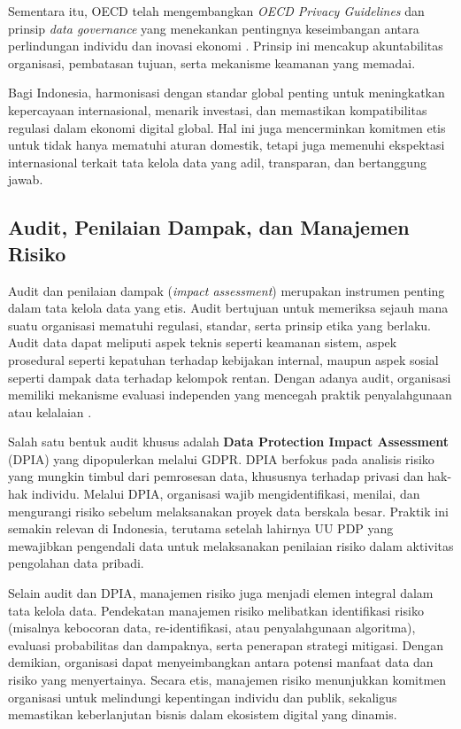 Sementara itu, OECD telah mengembangkan \textit{OECD Privacy Guidelines} dan prinsip \textit{data governance} yang menekankan pentingnya keseimbangan antara perlindungan individu dan inovasi ekonomi \cite{oecd2015}. Prinsip ini mencakup akuntabilitas organisasi, pembatasan tujuan, serta mekanisme keamanan yang memadai.  

Bagi Indonesia, harmonisasi dengan standar global penting untuk meningkatkan kepercayaan internasional, menarik investasi, dan memastikan kompatibilitas regulasi dalam ekonomi digital global. Hal ini juga mencerminkan komitmen etis untuk tidak hanya mematuhi aturan domestik, tetapi juga memenuhi ekspektasi internasional terkait tata kelola data yang adil, transparan, dan bertanggung jawab.

\subsection{Audit, Penilaian Dampak, dan Manajemen Risiko}

Audit dan penilaian dampak (\textit{impact assessment}) merupakan instrumen penting dalam tata kelola data yang etis. Audit bertujuan untuk memeriksa sejauh mana suatu organisasi mematuhi regulasi, standar, serta prinsip etika yang berlaku. Audit data dapat meliputi aspek teknis seperti keamanan sistem, aspek prosedural seperti kepatuhan terhadap kebijakan internal, maupun aspek sosial seperti dampak data terhadap kelompok rentan. Dengan adanya audit, organisasi memiliki mekanisme evaluasi independen yang mencegah praktik penyalahgunaan atau kelalaian \cite{isaca2019}.  

Salah satu bentuk audit khusus adalah \textbf{Data Protection Impact Assessment} (DPIA) yang dipopulerkan melalui GDPR. DPIA berfokus pada analisis risiko yang mungkin timbul dari pemrosesan data, khususnya terhadap privasi dan hak-hak individu. Melalui DPIA, organisasi wajib mengidentifikasi, menilai, dan mengurangi risiko sebelum melaksanakan proyek data berskala besar. Praktik ini semakin relevan di Indonesia, terutama setelah lahirnya UU PDP yang mewajibkan pengendali data untuk melaksanakan penilaian risiko dalam aktivitas pengolahan data pribadi.  

Selain audit dan DPIA, manajemen risiko juga menjadi elemen integral dalam tata kelola data. Pendekatan manajemen risiko melibatkan identifikasi risiko (misalnya kebocoran data, re-identifikasi, atau penyalahgunaan algoritma), evaluasi probabilitas dan dampaknya, serta penerapan strategi mitigasi. Dengan demikian, organisasi dapat menyeimbangkan antara potensi manfaat data dan risiko yang menyertainya. Secara etis, manajemen risiko menunjukkan komitmen organisasi untuk melindungi kepentingan individu dan publik, sekaligus memastikan keberlanjutan bisnis dalam ekosistem digital yang dinamis.

